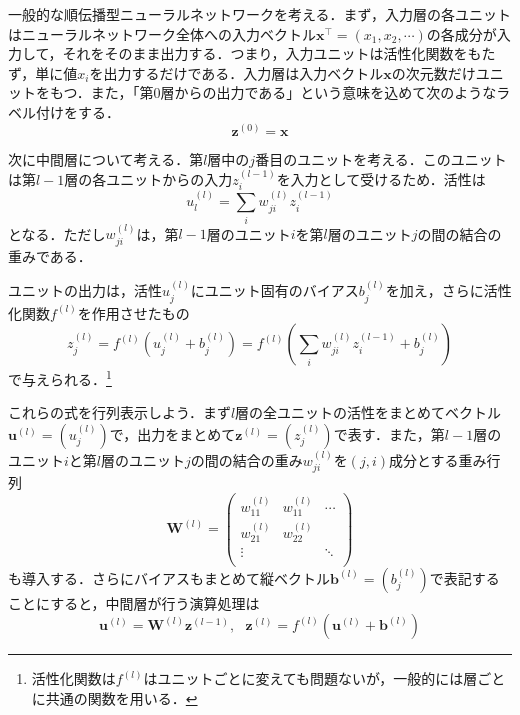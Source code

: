 \documentclass[a4paper,11pt]{jsreport}
\begin{document}
一般的な順伝播型ニューラルネットワークを考える．まず，入力層の各ユニットはニューラルネットワーク全体への入力ベクトル$\bm{x}^{\top}=(x_1, x_2, \cdots)$の各成分が入力して，それをそのまま出力する．つまり，入力ユニットは活性化関数をもたず，単に値$x_i$を出力するだけである．入力層は入力ベクトル$\bm{x}$の次元数だけユニットをもつ．また，「第0層からの出力である」という意味を込めて次のようなラベル付けをする．
\begin{equation}
  \bm{z}^{(0)} = \bm{x}
\end{equation}\par
次に中間層について考える．第$l$層中の$j$番目のユニットを考える．このユニットは第$l-1$層の各ユニットからの入力$z_i^{(l-1)}$を入力として受けるため．活性は
\begin{equation}
  u_l^{(l)} = \sum_i w_{ji}^{(l)} z_i^{(l-1)}
\end{equation}
となる．ただし$w_{ji}^{(l)}$は，第$l-1$層のユニット$i$を第$l$層のユニット$j$の間の結合の重みである．\par
ユニットの出力は，活性$u_j^{(l)}$にユニット固有のバイアス$b_j^{(l)}$を加え，さらに活性化関数$f^{(l)}$を作用させたもの
\begin{equation}
  z_j^{(l)}
  = f^{(l)} \left( u_j^{(l)} + b_j^{(l)} \right)
  = f^{(l)} \left( \sum_i w_{ji}^{(l)} z_i^{(l-1)} + b_j^{(l)} \right)
\end{equation}
で与えられる．\footnote{活性化関数は$f^{(l)}$はユニットごとに変えても問題ないが，一般的には層ごとに共通の関数を用いる．}\par
これらの式を行列表示しよう．まず$l$層の全ユニットの活性をまとめてベクトル$\bm{u}^{(l)}=\left( u_j^{(l)} \right)$で，出力をまとめて$\bm{z}^{(l)}=\left( z_j^{(l)} \right)$で表す．また，第$l-1$層のユニット$i$と第$l$層のユニット$j$の間の結合の重み$w_{ji}^{(l)}$を$(j,i)$成分とする重み行列
\begin{equation}
  \bm{W}^{(l)}
  =\begin{pmatrix}
    w_{11}^{(l)} & w_{11}^{(l)} & \cdots \\
    w_{21}^{(l)} & w_{22}^{(l)} &        \\
    \vdots       &              & \ddots \\
  \end{pmatrix}
\end{equation}
も導入する．さらにバイアスもまとめて縦ベクトル$\bm{b}^{(l)} = \left( b_j^{(l)} \right)$で表記することにすると，中間層が行う演算処理は
\begin{equation}
  \bm{u}^{(l)}
  = \bm{W}^{(l)} \bm{z}^{(l-1)}, \ \ \ \bm{z}^{(l)} = f^{(l)}\left( \bm{u}^{(l)} + \bm{b}^{(l)} \right)
\end{equation}
\end{document}
